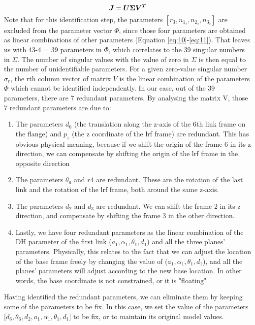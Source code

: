 \begin{equation}
 \vb*{J} = \vb*{U}\vb*{\Sigma}\vb*{V^T}
\end{equation}
Note that for this identification step, the parameters $[r_3, n_{1_z}, n_{2_z}, n_{3_z}]$ are excluded from the parameter vector $\Phi$, since those four parameters are obtained as linear combinations of other parameters (Equation \ref{eq:10}-\ref{eq:11}). That leaves us with 43-4 = 39 parameters in $\Phi$, which correlates to the 39 singular numbers in $\Sigma$. The number of singular values with the value of zero in $\Sigma$ is then equal to the number of unidentifiable parameters. For a given zero-value singular number $\sigma_r$, the rth column vector of matrix $V$ is the linear combination of the parameters $\Phi$ which cannot be identified independently. 
In our case, out of the 39 parameters, there are 7 redundant parameters. By analysing the matrix V, those 7 redundant parameters are due to:
\begin{enumerate}
\item The parameters $d_6$ (the translation along the z-axis of the 6th link frame on the flange) and $p_z$ (the z coordinate of the \ac{lrf} frame) are redundant. This has obvious physical meaning, because if we shift the origin of the frame 6 in its z direction, we can compensate by shifting the origin of the \ac{lrf} frame in the opposite direction
\item The parameters $\theta_6$ and $r4$ are redundant. These are the rotation of the last link and the rotation of the \ac{lrf} frame, both around the same z-axis. 
\item The parameters $d_2$ and $d_3$ are redundant. We can shift the frame 2 in its z direction, and compensate by shifting the frame 3 in the other direction. 
\item Lastly, we have four redundant parameters as the linear combination of the DH parameter of the first link ($a_1, \alpha_1, \theta_1, d_1$) and all the three planes' parameters. Physically, this relates to the fact that we can adjust the location of the base frame freely by changing the value of ($a_1, \alpha_1, \theta_1, d_1$), and all the planes' parameters will adjust according to the new base location. In other words, the base coordinate is not constrained, or it is "floating"
\end{enumerate}

Having identified the redundant parameters, we can eliminate them by keeping some of the parameters to be fix. In this case, we set the value of the parameters [$d_6, \theta_6, d_2, a_1, \alpha_1, \theta_1, d_1$] to be fix, or to maintain its original model values. 
